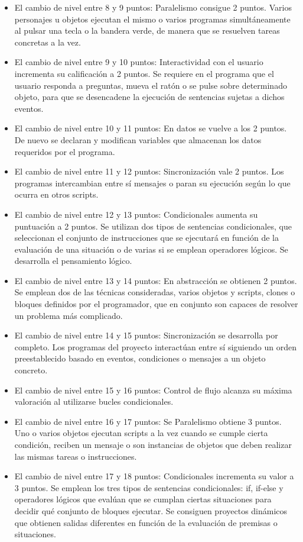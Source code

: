 \documentclass[a4paper, 12pt]{book}
\begin{document}
\begin{itemize}
 \item El cambio de nivel entre 8 y 9 puntos: Paralelismo consigue 2 puntos. Varios personajes u objetos ejecutan el mismo o varios programas simultáneamente al pulsar una tecla o la bandera verde, de manera que se resuelven tareas concretas a la vez.
 \item El cambio de nivel entre 9 y 10 puntos: Interactividad con el usuario incrementa su calificación a 2 puntos. Se requiere en el programa que el usuario responda a preguntas, mueva el ratón o se pulse sobre determinado objeto, para que se desencadene la ejecución de sentencias sujetas a dichos eventos.
 \item El cambio de nivel entre 10 y 11 puntos: En datos se vuelve a los 2 puntos. De nuevo se declaran y modifican variables que almacenan los datos requeridos por el programa.
 \item El cambio de nivel entre 11 y 12 puntos: Sincronización vale 2 puntos. Los programas intercambian entre sí mensajes o paran su ejecución según lo que ocurra en otros scripts.
 \item El cambio de nivel entre 12 y 13 puntos: Condicionales aumenta su puntuación a 2 puntos. Se utilizan dos tipos de sentencias condicionales, que seleccionan el conjunto de instrucciones que se ejecutará en función de la evaluación de una situación o de varias si se emplean operadores lógicos. Se desarrolla el pensamiento lógico.
 \item El cambio de nivel entre 13 y 14 puntos: En abstracción se obtienen 2 puntos. Se emplean dos de las técnicas consideradas, varios objetos y scripts, clones o bloques definidos por el programador, que en conjunto son capaces de resolver un problema más complicado.
 \item El cambio de nivel entre 14 y 15 puntos: Sincronización se desarrolla por completo. Los programas del proyecto interactúan entre sí siguiendo un orden preestablecido basado en eventos, condiciones o  mensajes a un objeto concreto. 
 \item El cambio de nivel entre 15 y 16 puntos: Control de flujo alcanza su máxima valoración al utilizarse bucles condicionales.
 \item El cambio de nivel entre 16 y 17 puntos: Se Paralelismo obtiene 3 puntos. Uno o varios objetos ejecutan scripts a la vez cuando se cumple cierta condición, reciben un mensaje o son instancias de objetos que deben realizar las mismas tareas o instrucciones.
 \item El cambio de nivel entre 17 y 18 puntos: Condicionales incrementa su valor a 3 puntos. Se emplean los tres tipos de sentencias condicionales: if, if-else y operadores lógicos que evalúan que se cumplan ciertas situaciones para decidir qué conjunto de bloques ejecutar. Se consiguen proyectos dinámicos que obtienen salidas diferentes en función de la evaluación de premisas o situaciones.

\end{itemize}
\end{document}

